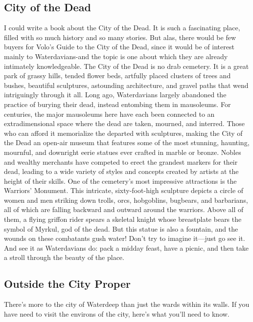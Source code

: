 \documentclass[10pt,a4paper,twoside,twocolumn,openany,nodeprecatedcode]{dndbook}
\begin{document}
\subsection{City of the Dead}
I could write a book about the City of the Dead. It is such a fascinating place, filled with so much history and so many stories. But alas, there would be few buyers for Volo's Guide to the City of the Dead, since it would be of interest mainly to Waterdavians-and the topic is one about which they are already intimately knowledgeable.
The City of the Dead is no drab cemetery. It is a great park of grassy hills, tended flower beds, artfully placed clusters of trees and bushes, beautiful sculptures, astounding architecture, and gravel paths that wend intriguingly through it all. Long ago, Waterdavians largely abandoned the practice of burying their dead, instead entombing them in mausoleums. For centuries, the major mausoleums here have each been connected to an extradimensional space where the dead are taken, mourned, and interred.
Those who can afford it memorialize the departed with sculptures, making the City of the Dead an open-air museum that features some of the most stunning, haunting, mournful, and downright eerie statues ever crafted in marble or bronze. Nobles and wealthy merchants have competed to erect the grandest markers for their dead, leading to a wide variety of styles and concepts created by artists at the height of their skills.
One of the cemetery's most impressive attractions is the Warriors' Monument. This intricate, sixty-foot-high sculpture depicts a circle of women and men striking down trolls, orcs, hobgoblins, bugbears, and barbarians, all of which are falling backward and outward around the warriors. Above all of them, a flying griffon rider spears a skeletal knight whose breastplate bears the symbol of Myrkul, god of the dead. But this statue is also a fountain, and the wounds on these combatants gush water! Don't try to imagine it—just go see it. And see it as Waterdavians do: pack a midday feast, have a picnic, and then take a stroll through the beauty of the place.
\subsection{Outside the City Proper}
There's more to the city of Waterdeep than just the wards within its walls. If you have need to visit the environs of the city, here's what you'll need to know.
\end{document}
